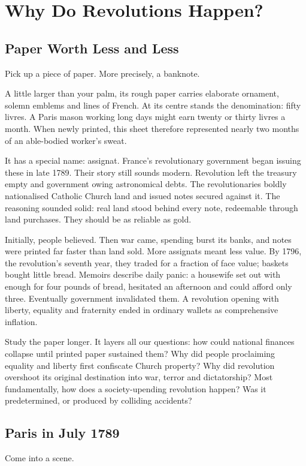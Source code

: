 \chapter{Why Do Revolutions Happen?}
\section{Paper Worth Less and Less}
Pick up a piece of paper. More precisely, a banknote.

A little larger than your palm, its rough paper carries elaborate ornament, solemn emblems and lines of French. At its centre stands the denomination: fifty livres. A Paris mason working long days might earn twenty or thirty livres a month. When newly printed, this sheet therefore represented nearly two months of an able-bodied worker's sweat.

It has a special name: assignat. France's revolutionary government began issuing these in late 1789. Their story still sounds modern. Revolution left the treasury empty and government owing astronomical debts. The revolutionaries boldly nationalised Catholic Church land and issued notes secured against it. The reasoning sounded solid: real land stood behind every note, redeemable through land purchases. They should be as reliable as gold.

Initially, people believed. Then war came, spending burst its banks, and notes were printed far faster than land sold. More assignats meant less value. By 1796, the revolution's seventh year, they traded for a fraction of face value; baskets bought little bread. Memoirs describe daily panic: a housewife set out with enough for four pounds of bread, hesitated an afternoon and could afford only three. Eventually government invalidated them. A revolution opening with liberty, equality and fraternity ended in ordinary wallets as comprehensive inflation.

Study the paper longer. It layers all our questions: how could national finances collapse until printed paper sustained them? Why did people proclaiming equality and liberty first confiscate Church property? Why did revolution overshoot its original destination into war, terror and dictatorship? Most fundamentally, how does a society-upending revolution happen? Was it predetermined, or produced by colliding accidents?

\section{Paris in July 1789}
Come into a scene.

